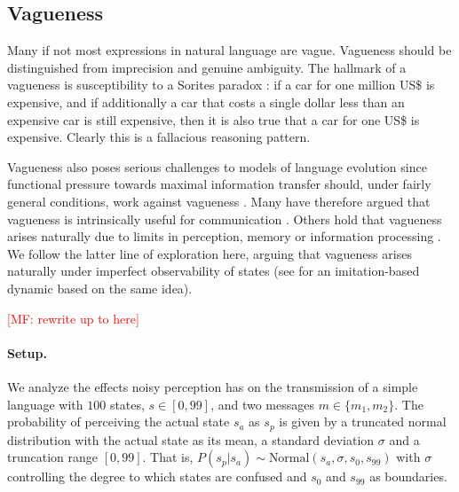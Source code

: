 \documentclass[10pt,a4paper]{article}
\newcommand{\mf}[1]{\textcolor{Red}{[MF: #1]}}
\begin{document}

\subsection{Vagueness}

Many if not most expressions in natural language are vague. Vagueness should be distinguished
from imprecision and genuine ambiguity. The hallmark of a vagueness is susceptibility to a
Sorites paradox \citep[e.g.][]{Williamson1994:Vagueness}: if a car for one million US\$ is
expensive, and if additionally a car that costs a single dollar less than an expensive car is still expensive,
then it is also true that a car for one US\$ is expensive. Clearly this is a fallacious reasoning pattern.

Vagueness also poses serious challenges to models of language evolution since functional
pressure towards maximal information transfer should, under fairly general conditions, work
against vagueness \citep{Lipman2009:Why-is-Language}. Many have therefore argued
that vagueness is intrinsically useful for communication
\citep[e.g.][]{Deemter2009:Utility-and-Lan,Jaegherde-JaegherRooijvan-Rooij2010:Strategic-Vague,BlumeBoard2013:Intentional-Vag}. Others
hold that vagueness arises naturally due to limits in perception, memory or information
processing
\citep[e.g.][]{FrankeJager2010:Vagueness-Signa,LassiterGoodman2015:Adjectival-vagu,OConnor2013:The-Evolution-o}. We
follow the latter line of exploration here, arguing that vagueness arises naturally under
imperfect observability of states (see \cite{franke+correia:toappear} for an imitation-based
dynamic based on the same idea).

\mf{rewrite up to here}

\paragraph{Setup.}  We analyze the effects noisy perception has on the transmission of a simple language with $100$
states, $s \in [0,99]$, and two messages $m \in \{m_1,m_2\}$. The probability of perceiving the
actual state $s_a$ as $s_p$ is given by a truncated normal distribution with the actual state as its mean, 
a standard deviation $\sigma$ and a truncation range $[0,99]$. That is, $P(s_p | s_a) \sim \text{Normal}(s_{a},\sigma,s_{0},s_{99})$
with $\sigma$ controlling the degree to which states are confused and $s_{0}$ and $s_{99}$ as boundaries.
\end{document}
